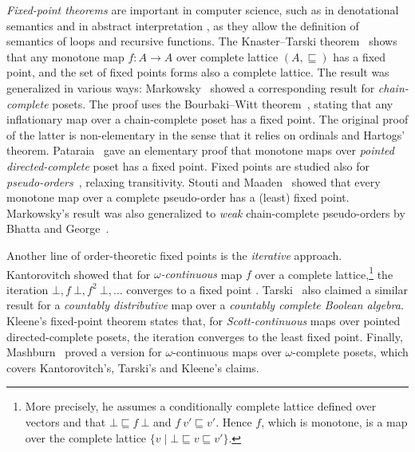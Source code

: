 \documentclass[11pt,a4paper]{article}
\newcommand\SLE{\sqsubseteq}
\begin{document}
\emph{Fixed-point theorems} are important in computer science, such as 
in denotational semantics \cite{scott71} and
in abstract interpretation \cite{cousot77}, as they allow the definition 
of semantics of loops and recursive functions.
The Knaster--Tarski theorem~\cite{tarski55}
shows that
any monotone map $f : A \to A$ over complete lattice $(A,\SLE)$ has a fixed point,
and the set of fixed points forms also a complete lattice.
The result was generalized in various ways:
Markowsky~\cite{markowsky76}
showed a corresponding result for \emph{chain-complete} posets.
The proof uses
the Bourbaki--Witt theorem~\cite{bourbaki49},
stating that any inflationary map over a chain-complete poset has a fixed point.
The original proof of the latter is non-elementary in
the sense that it relies on ordinals and Hartogs' theorem.
Pataraia~\cite{pataraia97}
gave an elementary proof that
monotone maps over \emph{pointed directed-complete} poset
has a fixed point.
Fixed points are studied also for \emph{pseudo-orders}~\cite{trellis},
relaxing transitivity.
Stouti and Maaden~\cite{SM13} showed that every monotone map over a complete pseudo-order has a (least) fixed point.
Markowsky's result was also generalized to
\emph{weak} chain-complete pseudo-orders by Bhatta and George~\cite{Bhatta05,BG11}.

Another line of order-theoretic fixed points is the \emph{iterative} approach.
Kantorovitch showed that
for \emph{$\omega$-continuous} map $f$
over a complete lattice,\footnote{
More precisely,
he assumes a conditionally complete lattice defined over vectors and that
$\bot \SLE f\:\bot$ and $f\:v' \SLE v'$.
Hence $f$, which is monotone,
is a map over the complete lattice $\{v \mid \bot \SLE v \SLE v'\}$.
}
the
iteration $\bot, f\:\bot,f^2\:\bot,\dots$ converges to a fixed point
\cite[Theorem I]{kantorovitch39}.
Tarski~\cite{tarski55} also claimed a similar result for a
\emph{countably distributive} map over a
\emph{countably complete Boolean algebra}.
Kleene's fixed-point theorem states that,
for \emph{Scott-continuous} maps over pointed directed-complete posets,
the iteration converges to the least fixed point.
Finally, Mashburn~\cite{mashburn83} proved a version for 
$\omega$-continuous maps over $\omega$-complete posets,
which covers Kantorovitch's, Tarski's and Kleene's claims.



\end{document}
